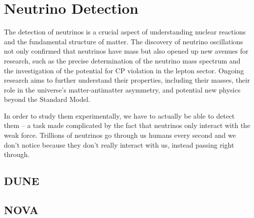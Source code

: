 \section{Neutrino Detection}

The detection of neutrinos is a crucial aspect of understanding nuclear reactions and the fundamental structure of matter.
The discovery of neutrino oscillations not only confirmed that neutrinos have mass but also opened up new avenues for research, such as the precise determination of the neutrino mass spectrum and the investigation of the potential for CP violation in the lepton sector.
Ongoing research aims to further understand their properties, including their masses, their role in the universe's matter-antimatter asymmetry, and potential new physics beyond the Standard Model.

In order to study them experimentally, we have to actually be able to detect them -- a task made complicated by the fact that neutrinos only interact with the weak force.
Trillions of neutrinos go through us humans every second and we don't notice because they don't really interact with us, instead passing right through.




  \subsection{DUNE}

  \subsection{NOVA}